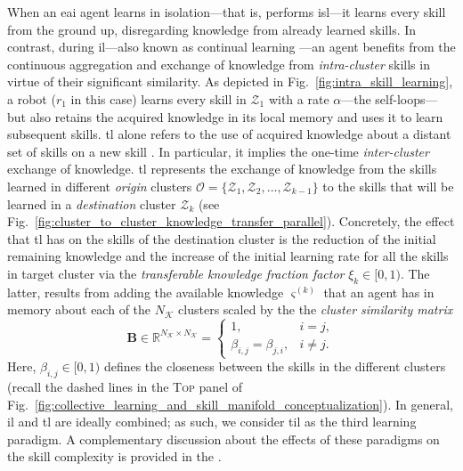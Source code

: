 \documentclass[12pt]{article}
\renewcommand{\emph}[1]{\textit{#1}}
\begin{document}
When an \ac{eai} agent learns in isolation---that is, performs \ac{isl}---it learns every skill from the ground up, disregarding knowledge from already learned skills. In contrast, during \ac{il}---also known as continual learning \cite{Lesort2020Continuallearningrobotics}---an agent benefits from the continuous aggregation and exchange of knowledge from \emph{intra-cluster} skills in virtue of their significant similarity. As depicted in Fig.~\ref{fig:intra_skill_learning}, a robot ($r_1$ in this case) learns every skill in $\mathcal{Z}_1$ with a rate $\alpha$---the self-loops---but also retains the acquired knowledge in its local memory and uses it to learn subsequent skills. \Ac{tl} alone refers to the use of acquired knowledge about a distant set of skills on a new skill \cite{Hosna2022Transferlearningfriendly,Jaquier2023TransferLearningRobotics}. In particular, it implies the one-time \emph{inter-cluster} exchange of knowledge. \Ac{tl} represents the exchange of knowledge from the skills learned in different \emph{origin} clusters $\mathcal{O} = \{ \mathcal{Z}_1,\mathcal{Z}_2,\ldots,\mathcal{Z}_{k-1} \}$ to the skills that will be learned in a \emph{destination} cluster $\mathcal{Z}_k$ (see Fig.~\ref{fig:cluster_to_cluster_knowledge_transfer_parallel}). Concretely, the effect that \ac{tl} has on the skills of the destination cluster is the reduction of the initial remaining knowledge and the increase of the initial learning rate for all the skills in target cluster via the \emph{transferable knowledge fraction factor} $\xi_k \in [0,1)$. The latter, results from adding the available knowledge $\varsigma^{(k)}$ that an agent has in memory about each of the $N_\mathcal{K}$ clusters scaled by the the \emph{cluster similarity matrix}
\begin{equation}\label{eq:cluster_similarity_matrix}
	\bm{B}\in \mathbb{R}^{N_\mathcal{K} \times N_\mathcal{K}}=\begin{cases}
		1, & i=j, \\
		\beta_{i,j} = \beta_{j,i}, & i \neq j.
	\end{cases}
\end{equation}
Here, $\beta_{i,j} \in [0,1)$ defines the closeness between the skills in the different clusters (recall the dashed lines in the \textsc{Top} panel of Fig.~\ref{fig:collective_learning_and_skill_manifold_conceptualization}). In general, \ac{il} and \ac{tl} are ideally combined; as such, we consider \ac{til} as the third learning paradigm. A complementary discussion about the effects of these paradigms on the skill complexity is provided in the .
\end{document}
